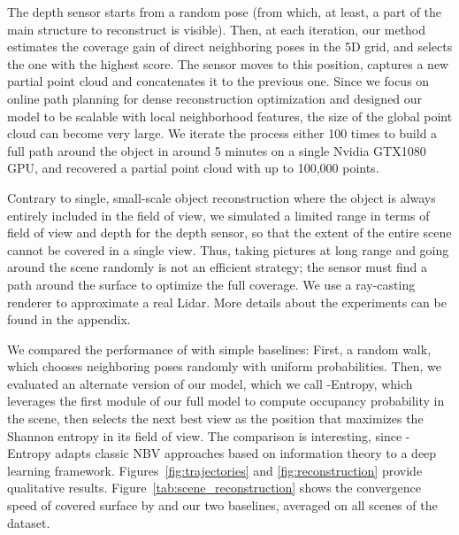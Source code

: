 The depth sensor starts from a random pose (from which, at least, a part of the main structure to reconstruct is visible). Then, at each iteration, our method estimates the coverage gain of direct neighboring poses in the 5D grid, and selects the one with the highest score. The sensor moves to this position, captures a new partial point cloud and concatenates it to the previous one. Since we focus on online path planning for dense reconstruction optimization and designed our model to be scalable with local neighborhood features, the size of the global point cloud can become very large. 
We iterate the process either 100 times to build a full path around the object in around 5 minutes on a single Nvidia GTX1080 GPU, and recovered a partial point cloud with up to 100,000 points.


Contrary to single, small-scale object reconstruction where the object is always entirely included in the field of view, we simulated a limited range in terms of field of view and depth for the depth sensor, so that the extent of the entire scene cannot be covered in a single view. Thus, taking pictures at long range and going around the scene randomly is not an efficient strategy; the sensor must find a path around the surface to optimize the full coverage. We use a ray-casting renderer to approximate a real Lidar. More details about the experiments can be found in the appendix.

We compared the performance of \method with simple baselines: First, a random walk, which chooses neighboring poses randomly with uniform probabilities. Then, we evaluated an alternate version of our model, which we call \method-Entropy, which leverages the first module of our full model to compute occupancy probability in the scene, then selects the next best view as the position that maximizes the Shannon entropy in its field of view. The comparison is interesting, since \method-Entropy adapts classic NBV approaches based on information theory to a deep learning framework. Figures~\ref{fig:trajectories} and \ref{fig:reconstruction} provide qualitative results. Figure~\ref{tab:scene_reconstruction} shows the convergence speed of covered surface by \method and our two baselines, averaged on all scenes of the dataset. %

